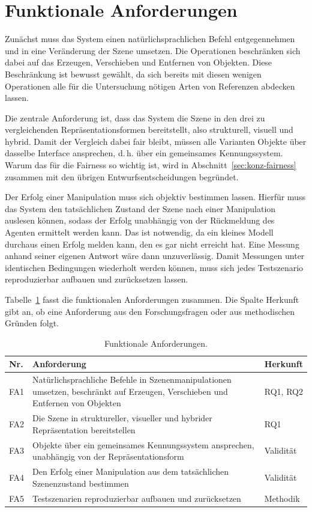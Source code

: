 \section{Funktionale Anforderungen}
\label{sec:anf-funktional}

Zunächst muss das System einen natürlichsprachlichen Befehl entgegennehmen und in eine Veränderung der Szene umsetzen.
Die Operationen beschränken sich dabei auf das Erzeugen, Verschieben und Entfernen von Objekten.
Diese Beschränkung ist bewusst gewählt, da sich bereits mit diesen wenigen Operationen alle für die Untersuchung nötigen Arten von Referenzen abdecken lassen.

Die zentrale Anforderung ist, dass das System die Szene in den drei zu vergleichenden Repräsentationsformen bereitstellt, also strukturell, visuell und hybrid.
Damit der Vergleich dabei fair bleibt, müssen alle Varianten Objekte über dasselbe Interface ansprechen, d.\,h. über ein gemeinsames Kennungssystem.
Warum das für die Fairness so wichtig ist, wird in Abschnitt~\ref{sec:konz-fairness} zusammen mit den übrigen Entwurfsentscheidungen begründet.

Der Erfolg einer Manipulation muss sich objektiv bestimmen lassen.
Hierfür muss das System den tatsächlichen Zustand der Szene nach einer Manipulation auslesen können, sodass der Erfolg unabhängig von der Rückmeldung des Agenten ermittelt werden kann.
Das ist notwendig, da ein kleines Modell durchaus einen Erfolg melden kann, den es gar nicht erreicht hat.
Eine Messung anhand seiner eigenen Antwort wäre dann unzuverlässig.
Damit Messungen unter identischen Bedingungen wiederholt werden können, muss sich jedes Testszenario reproduzierbar aufbauen und zurücksetzen lassen.

Tabelle~\ref{tab:fa} fasst die funktionalen Anforderungen zusammen.
Die Spalte Herkunft gibt an, ob eine Anforderung aus den Forschungsfragen oder aus methodischen Gründen folgt.

\begin{table}[htbp]
  \centering
  \caption{Funktionale Anforderungen.}
  \label{tab:fa}
  \small
  \setlength{\tabcolsep}{5pt}
  \renewcommand{\arraystretch}{1.3}
  \begin{tabular}{@{}l p{9.4cm} l@{}}
    \toprule
    Nr. & Anforderung & Herkunft \\
    \midrule
    FA1 & Natürlichsprachliche Befehle in Szenenmanipulationen umsetzen, beschränkt auf Erzeugen, Verschieben und Entfernen von Objekten & RQ1, RQ2 \\
    FA2 & Die Szene in struktureller, visueller und hybrider Repräsentation bereitstellen & RQ1 \\
    FA3 & Objekte über ein gemeinsames Kennungssystem ansprechen, unabhängig von der Repräsentationsform & Validität \\
    FA4 & Den Erfolg einer Manipulation aus dem tatsächlichen Szenenzustand bestimmen & Validität \\
    FA5 & Testszenarien reproduzierbar aufbauen und zurücksetzen & Methodik \\
    \bottomrule
  \end{tabular}
\end{table}


